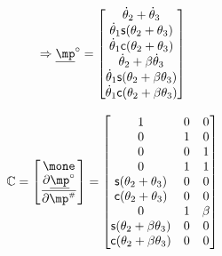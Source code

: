 \documentclass[a4paper,11pt,brazil,fleqn]{article}
\begin{document}
\begin{equation}
\Rightarrow
\underline{\mp}^\circ = 
\begin{bmatrix}
\dot{\theta}_2 + \dot{\theta}_3 \\
\dot{\theta}_1 \ssin(\theta_2+\theta_3) \\
\dot{\theta}_1 \ccos(\theta_2+\theta_3) \\
\dot{\theta}_2 + \beta\dot{\theta}_3 \\
\dot{\theta}_1 \ssin(\theta_2+\beta\theta_3) \\
\dot{\theta}_1 \ccos(\theta_2+\beta\theta_3) \\
\end{bmatrix}
\end{equation}

\begin{equation}
\mC =
\begin{bmatrix}
\mone \\
\displaystyle\frac{\partial \underline{\mp}^\circ}{\partial \mp\ssh}
\end{bmatrix}  =
\begin{bmatrix}
1 & 0 & 0 \\
0 & 1 & 0 \\
0 & 0 & 1 \\
0 & 1 & 1 \\
\ssin(\theta_2+\theta_3) & 0 & 0 \\
\ccos(\theta_2+\theta_3) & 0 & 0 \\
0 & 1 & \beta \\
\ssin(\theta_2+\beta\theta_3) & 0 & 0 \\
\ccos(\theta_2+\beta\theta_3) & 0 & 0 \\
\end{bmatrix} 
\end{equation}
\end{document}
